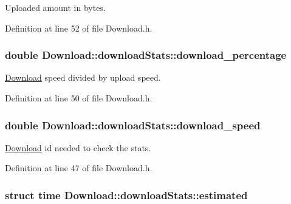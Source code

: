 Uploaded amount in bytes. 



Definition at line 52 of file Download.h.

\hypertarget{structDownload_1_1downloadStats_a173f29240d01632fb4b13a00db9200ad}{
\subsubsection[{download\_\-percentage}]{\setlength{\rightskip}{0pt plus 5cm}double {\bf Download::downloadStats::download\_\-percentage}}}
\label{structDownload_1_1downloadStats_a173f29240d01632fb4b13a00db9200ad}


\hyperlink{classDownload}{Download} speed divided by upload speed. 



Definition at line 50 of file Download.h.

\hypertarget{structDownload_1_1downloadStats_aacc99279e14b96fd00be47ae7fac9a53}{
\subsubsection[{download\_\-speed}]{\setlength{\rightskip}{0pt plus 5cm}double {\bf Download::downloadStats::download\_\-speed}}}
\label{structDownload_1_1downloadStats_aacc99279e14b96fd00be47ae7fac9a53}


\hyperlink{classDownload}{Download} id needed to check the stats. 



Definition at line 47 of file Download.h.

\hypertarget{structDownload_1_1downloadStats_aa3e1fb3093ef07283b62d37322594b97}{
\subsubsection[{estimated}]{\setlength{\rightskip}{0pt plus 5cm}struct {\bf time} {\bf Download::downloadStats::estimated}}}
\label{structDownload_1_1downloadStats_aa3e1fb3093ef07283b62d37322594b97}


